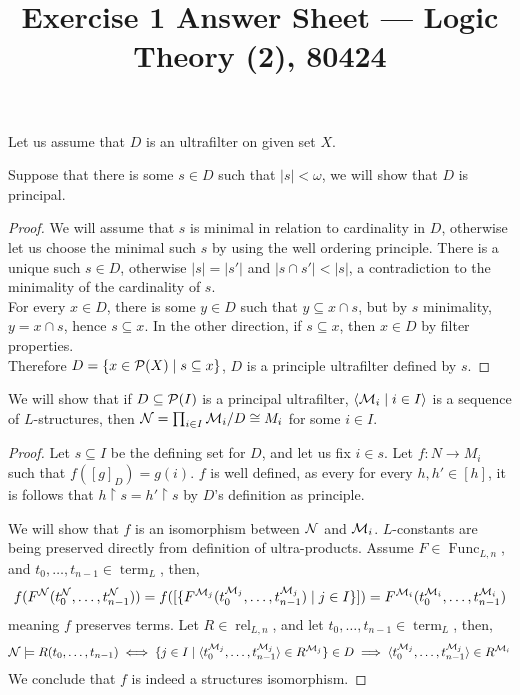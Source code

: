 
\title{Exercise 1 Answer Sheet --- Logic Theory (2), 80424}


\maketitle
\maketitleprint{}

\question{}
Let us assume that $D$ is an ultrafilter on given set $X$.

\subquestion{}
Suppose that there is some $s \in D$ such that $|s| < \omega$, we will show that $D$ is principal.
\begin{proof}
	We will assume that $s$ is minimal in relation to cardinality in $D$, otherwise let us choose the minimal such $s$ by using the well ordering principle.
	There is a unique such $s \in D$, otherwise $|s| = |s'|$ and $|s \cap s'| < |s|$, a contradiction to the minimality of the cardinality of $s$. \\
	For every $x \in D$, there is some $y \in D$ such that $y \subseteq x \cap s$, but by $s$ minimality, $y = x \cap s$, hence $s \subseteq x$.
	In the other direction, if $s \subseteq x$, then $x \in D$ by filter properties. \\
	Therefore $D = \{ x \in \mathcal{P}(X) \mid s \subseteq x \}$, $D$ is a principle ultrafilter defined by $s$.
\end{proof}

\subquestion{}
We will show that if $D \subseteq \mathcal{P}(I)$ is a principal ultrafilter, $\langle \mathcal{M}_i \mid i \in I \rangle$ is a sequence of $L$-structures, then $\mathcal{N} = \prod_{i \in I} \mathcal{M}_i / D \cong M_i$ for some $i \in I$.
\begin{proof}
	Let $s \subseteq I$ be the defining set for $D$, and let us fix $i \in s$.
	Let $f : N \to M_i$ such that $f({[g]}_D) = g(i)$.
	$f$ is well defined, as every for every $h, h' \in [h]$, it is follows that $h \restriction s = h' \restriction s$ by $D$'s definition as principle.

	We will show that $f$ is an isomorphism between $\mathcal{N}$ and $\mathcal{M}_i$.
	$L$-constants are being preserved directly from definition of ultra-products.
	Assume $F \in \operatorname{Func}_{L, n}$, and $t_0, \dots, t_{n - 1} \in \operatorname{term}_L$, then,
	\[
		f(F^{\mathcal{N}}(t_0^{\mathcal{N}}, \dots, t_{n - 1}^{\mathcal{N}}))
		= f([\{ F^{\mathcal{M}_j}(t_0^{\mathcal{M}_j}, \dots, t_{n - 1}^{\mathcal{M}_j}) \mid j \in I \}])
		= F^{\mathcal{M}_i}(t_0^{\mathcal{M}_i}, \dots, t_{n - 1}^{\mathcal{M}_i})
	\]
	meaning $f$ preserves terms.
	Let $R \in \operatorname{rel}_{L, n}$, and let $t_0, \dots, t_{n - 1} \in \operatorname{term}_L$, then,
	\[
		\mathcal{N} \models R(t_0, \dots, t_{n - 1})
		\iff \{ j \in I \mid \langle t_0^{\mathcal{M}_j}, \dots, t_{n - 1}^{\mathcal{M}_j} \rangle \in R^{\mathcal{M}_j} \} \in D
		\implies \langle t_0^{\mathcal{M}_j}, \dots, t_{n - 1}^{\mathcal{M}_j} \rangle \in R^{\mathcal{M}_i}
	\]
	We conclude that $f$ is indeed a structures isomorphism.
\end{proof}

